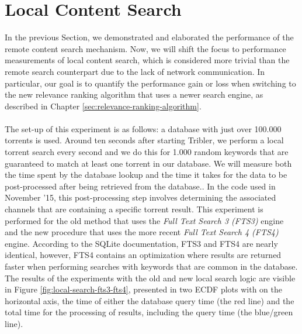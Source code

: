 \section{Local Content Search}
\label{sec:local-content-search}
In the previous Section, we demonstrated and elaborated the performance of the remote content search mechanism. Now, we will shift the focus to performance measurements of local content search, which is considered more trivial than the remote search counterpart due to the lack of network communication. In particular, our goal is to quantify the performance gain or loss when switching to the new relevance ranking algorithm that uses a newer search engine, as described in Chapter \ref{sec:relevance-ranking-algorithm}.\\\\
The set-up of this experiment is as follows: a database with just over 100.000 torrents is used. Around ten seconds after starting Tribler, we perform a local torrent search every second and we do this for 1.000 random keywords that are guaranteed to match at least one torrent in our database. We will measure both the time spent by the database lookup and the time it takes for the data to be post-processed after being retrieved from the database.. In the code used in November '15, this post-processing step involves determining the associated channels that are containing a specific torrent result. This experiment is performed for the old method that uses the \emph{Full Text Search 3 (FTS3)} engine and the new procedure that uses the more recent \emph{Full Text Search 4 (FTS4)} engine. According to the SQLite documentation, FTS3 and FTS4 are nearly identical, however, FTS4 contains an optimization where results are returned faster when performing searches with keywords that are common in the database. The results of the experiments with the old and new local search logic are visible in Figure \ref{fig:local-search-fts3-fts4}, presented in two ECDF plots with on the horizontal axis, the time of either the database query time (the red line) and the total time for the processing of results, including the query time (the blue/green line).\\

